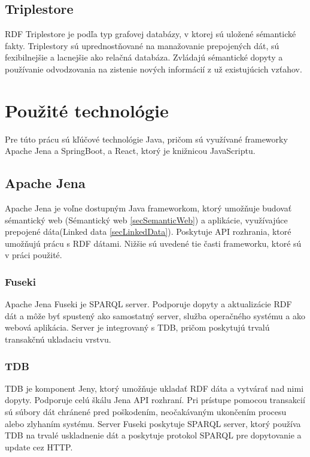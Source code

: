 \subsection{Triplestore} \label{secTriplestore}
RDF Triplestore je podľa \cite{triplestore} typ grafovej databázy, v ktorej sú uložené sémantické
fakty. Triplestory sú uprednostňované na manažovanie prepojených dát, sú fexibilnejšie
a lacnejšie ako relačná databáza. Zvládajú sémantické dopyty a používanie odvodzovania na zistenie nových informácií z už existujúcich vzťahov.

\section{Použité technológie} \label{secTechnologie}
Pre túto prácu sú kľúčové technológie Java, pričom sú využívané frameworky Apache Jena a SpringBoot, a React, ktorý je knižnicou JavaScriptu.

\subsection{Apache Jena} \label{secJena}
Apache Jena {\cite{jena}} je voľne dostupným Java frameworkom, ktorý umožňuje budovať sémantický web (Sémantický web \ref{secSemanticWeb}) a aplikácie, využívajúce prepojené dáta(Linked data \ref{secLinkedData}). Poskytuje API rozhrania, ktoré umožňujú prácu s RDF dátami. Nižšie sú uvedené tie časti frameworku, ktoré sú v práci použité.
\subsubsection{Fuseki}
Apache Jena Fuseki je SPARQL server. Podporuje dopyty a aktualizácie RDF dát a môže byť spustený ako samostatný server, služba operačného systému a ako webová aplikácia. Server je integrovaný s TDB, pričom poskytujú trvalú transakčnú ukladaciu vrstvu. 

\subsubsection{TDB}
TDB je komponent Jeny, ktorý umožňuje ukladať RDF dáta a vytvárať nad nimi dopyty. Podporuje celú škálu Jena API rozhraní. Pri prístupe pomocou transakcií sú súbory dát chránené pred poškodením, neočakávaným ukončením procesu alebo zlyhaním systému. Server Fuseki poskytuje SPARQL server, ktorý používa TDB na trvalé uskladnenie dát a poskytuje protokol SPARQL pre dopytovanie a
update cez HTTP.

